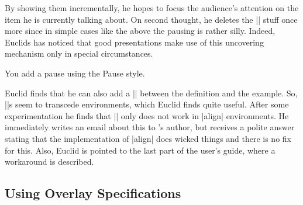 By showing them incrementally, he
hopes to focus the audience's attention on the item he is currently
talking about. On second thought, he deletes the |\pause| stuff once
more since in simple cases like the above the pausing is rather
silly. Indeed, Euclids has noticed that good presentations make use of
this uncovering mechanism only in special circumstances.

\lyxnote
You add a pause using the Pause style.

Euclid finds that he can also add a |\pause| between the definition
and the example. So, |\pause|s seem to transcede environments, which
Euclid finds quite useful. After some experimentation he finds that
|\pause| only does not work in |align| environments. He immediately
writes an email about this to \beamer's author, but receives a polite
answer stating that the implementation of |align| does wicked things
and there is no fix for this. Also, Euclid is pointed to the last part
of the user's guide, where a workaround is described. 


\subsection{Using Overlay Specifications}

